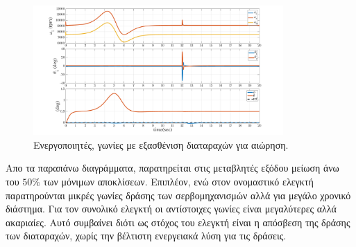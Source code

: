 \begin{figure}[H]
    \centering
    \includegraphics[width=0.85\textwidth]{Results/sigmoid_w_2.png}
    \caption{Ενεργοποιητές, γωνίες  με εξασθένιση διαταραχών για 
    αιώρηση.}
    \label{fig:takeoff_w_2}
\end{figure}

Απο τα παραπάνω διαγράμματα, παρατηρείται στις μεταβλητές εξόδου μείωση άνω του
$50\%$ των μόνιμων αποκλίσεων. Επιπλέον, ενώ στον ονομαστικό ελεγκτή 
παρατηρούνται μικρές γωνίες δράσης των σερβομηχανισμών αλλά για μεγάλο χρονικό 
διάστημα. Για τον συνολικό ελεγκτή οι αντίστοιχες γωνίες είναι μεγαλύτερες 
αλλά ακαριαίες. Αυτό συμβαίνει διότι ως στόχος του ελεγκτή είναι η απόσβεση της 
δράσης των διαταραχών, χωρίς την βέλτιστη ενεργειακά λύση για τις δράσεις. 

